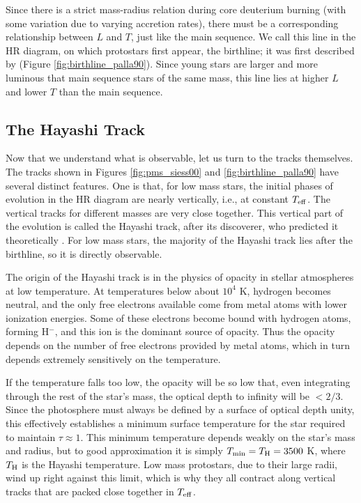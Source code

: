 Since there is a strict mass-radius relation during core deuterium burning (with some variation due to varying accretion rates), there must be a corresponding relationship between $L$ and $T$, just like the main sequence. We call this line in the HR diagram, on which protostars first appear, the birthline; it was first described by \citet{palla90a} (Figure \ref{fig:birthline_palla90}). Since young stars are larger and more luminous that main sequence stars of the same mass, this line lies at higher $L$ and lower $T$ than the main sequence.

\subsection{The Hayashi Track}

Now that we understand what is observable, let us turn to the tracks themselves. The tracks shown in Figures \ref{fig:pms_siess00} and \ref{fig:birthline_palla90} have several distinct features. One is that, for low mass stars, the initial phases of evolution in the HR diagram are nearly vertically, i.e., at constant $T_{\rm eff}$. The vertical tracks for different masses are very close together. This vertical part of the evolution is called the Hayashi track, after its discoverer, who predicted it theoretically \citep{hayashi61a}. For low mass stars, the majority of the Hayashi track lies after the birthline, so it is directly observable.

The origin of the Hayashi track is in the physics of opacity in stellar atmospheres at low temperature. At temperatures below about $10^4$ K, hydrogen becomes neutral, and the only free electrons available come from metal atoms with lower ionization energies. Some of these electrons become bound with hydrogen atoms, forming H$^-$, and this ion is the dominant source of opacity.  Thus the opacity depends on the number of free electrons provided by metal atoms, which in turn depends extremely sensitively on the temperature.

If the temperature falls too low, the opacity will be so low that, even integrating through the rest of the star's mass, the optical depth to infinity will be $<2/3$. Since the photosphere must always be defined by a surface of optical depth unity, this effectively establishes a minimum surface temperature for the star required to maintain $\tau \approx 1$. This minimum temperature depends weakly on the star's mass and radius, but to good approximation it is simply $T_{\rm min} = T_{\rm H} = 3500$ K, where $T_{\rm H}$ is the Hayashi temperature. Low mass protostars, due to their large radii, wind up right against this limit, which is why they all contract along vertical tracks that are packed close together in $T_{\rm eff}$.

